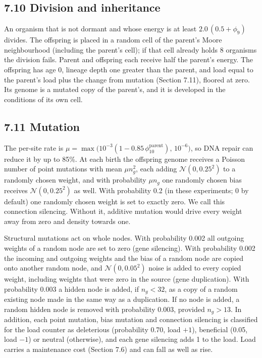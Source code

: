 \subsection*{7.10 Division and inheritance}
An organism that is not dormant and whose energy is at least $2.0\,(0.5+\phi_9)$
divides. The offspring is placed in a random cell of the parent's Moore
neighbourhood (including the parent's cell); if that cell already holds 8
organisms the division fails. Parent and offspring each receive half the parent's
energy. The offspring has age 0, lineage depth one greater than the parent, and
load equal to the parent's load plus the change from mutation (Section 7.11),
floored at zero. Its genome is a mutated copy of the parent's, and it is
developed in the conditions of its own cell.

\subsection*{7.11 Mutation}
The per-site rate is $\mu = \max\big(10^{-3}(1 - 0.85\,\phi_{10}^{\text{parent}}),\,10^{-6}\big)$,
so DNA repair can reduce it by up to 85\%. At each birth the offspring genome
receives a Poisson number of point mutations with mean $\mu n_g^2$, each adding
$\mathcal{N}(0,0.25^2)$ to a randomly chosen weight, and with probability $\mu n_g$
one randomly chosen bias receives $\mathcal{N}(0,0.25^2)$ as well. With
probability 0.2 (in these experiments; 0 by default) one randomly chosen weight is
set to exactly zero. We call this connection silencing. Without it, additive
mutation would drive every weight away from zero and density towards one.

Structural mutations act on whole nodes. With probability 0.002 all outgoing
weights of a random node are set to zero (gene silencing). With probability 0.002
the incoming and outgoing weights and the bias of a random node are copied onto
another random node, and $\mathcal{N}(0,0.05^2)$ noise is added to every copied
weight, including weights that were zero in the source (gene duplication). With
probability 0.003 a hidden node is added, if $n_g<32$, as a copy of a random
existing node made in the same way as a duplication. If no node is added, a random
hidden node is removed with probability 0.003, provided $n_g>13$.
In addition, each point mutation, bias mutation and connection silencing is
classified for the load counter as deleterious (probability 0.70, load $+1$),
beneficial (0.05, load $-1$) or neutral (otherwise), and each gene silencing adds
1 to the load. Load carries a maintenance cost (Section 7.6) and can fall as well
as rise.

